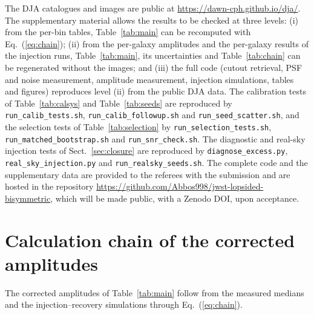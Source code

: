 \documentclass[fleqn,usenatbib]{mnras}
\begin{document}
The DJA catalogues and images are public at
\url{https://dawn-cph.github.io/dja/}. The supplementary material allows the
results to be checked at three levels: (i) from the per-bin tables,
Table~\ref{tab:main} can be recomputed with Eq.~(\ref{eq:chain}); (ii) from the
per-galaxy amplitudes and the per-galaxy results of the injection runs,
Table~\ref{tab:main}, its uncertainties and Table~\ref{tab:chain} can be
regenerated without the images; and (iii) the full code (cutout retrieval, PSF
and noise measurement, amplitude measurement, injection simulations, tables and
figures) reproduces level (ii) from the public DJA data. The calibration tests
of Table~\ref{tab:calsys} and Table~\ref{tab:seeds} are reproduced by
\texttt{run\_calib\_tests.sh}, \texttt{run\_calib\_followup.sh} and
\texttt{run\_seed\_scatter.sh}, and the selection tests of
Table~\ref{tab:selection} by \texttt{run\_selection\_tests.sh},
\texttt{run\_matched\_bootstrap.sh} and \texttt{run\_snr\_check.sh}. The
diagnostic and real-sky injection tests of Sect.~\ref{sec:closure} are reproduced
by \texttt{diagnose\_excess.py}, \texttt{real\_sky\_injection.py} and
\texttt{run\_realsky\_seeds.sh}. The complete code and the supplementary data are
provided to the referees with the submission and are hosted in the repository
\url{https://github.com/Abbos998/jwst-lopsided-bisymmetric}, which will be made
public, with a Zenodo DOI, upon acceptance.




\appendix

\section{Calculation chain of the corrected amplitudes}\label{app:chain}

The corrected amplitudes of Table~\ref{tab:main} follow from the measured
medians and the injection--recovery simulations through Eq.~(\ref{eq:chain}).
\end{document}
